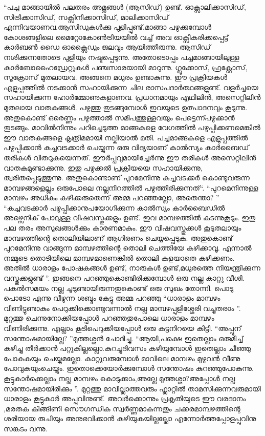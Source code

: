 ``പച്ച മാങ്ങായിൽ പലതരം അമ്ലങ്ങൾ (ആസിഡ്) ഉണ്ട്. ഓക്സാലിക്കാസിഡ്, സിട്രിക്കാസിഡ്, സക്സിനിക്കാസിഡ്, മാലിക്കാസിഡ് എന്നിവയാണവ.ആസിഡുകൾക്കു പുളിപ്പുണ്ട്.മാങ്ങാ പഴുക്കുമ്പോൾ കോശങ്ങളിലെ മൈറ്റോകോൺട്രിയയിൽ വച്ച് അവ ഓക്സീകരിക്കപ്പെട്ട് കാർബൺ ഡൈ ഓക്സൈഡും ജലവും ആയിത്തീരുന്നു. ആസിഡ് നശിക്കുന്നതോടെ പുളിയും നഷ്ടപ്പെടുന്നു. അതോടൊപ്പം പച്ചമാങ്ങായിലുള്ള കാർബോഹൈഡ്രേറ്റുകൾ പഞ്ചസാരയായി മാറുന്നു. ഗ്ലൂക്കോസ്, ഫ്രക്റ്റോസ്, സൂക്രോസ് മുതലായവ. അങ്ങനെ മധുരം ഉണ്ടാകുന്നു.
ഈ പ്രക്രിയകൾ എളുപ്പത്തിൽ നടക്കാൻ സഹായിക്കുന്ന ചില രാസപദാർത്ഥങ്ങളുണ്ട്. വളർച്ചയെ സഹായിക്കുന്ന ഹോർമ്മോണുകളാണവ. പ്രധാനമായും എഥിലിൻ, അസെറ്റിലിൻ മുതലായ വാതകങ്ങൾ. പഴുത്തു തുടങ്ങുമ്പോൾ ഇവയുടെ ഉത്പാദനവും കൂടുന്നു. അതുകൊണ്ട് ഒരെണ്ണം പഴുത്താൽ സമീപത്തുള്ളവയും പെട്ടെന്ന്പഴുക്കാൻ തുടങ്ങും. മാവിൽനിന്നും പറിച്ചെടുത്ത മാങ്ങകളെ വേഗത്തിൽ പഴുപ്പിക്കണമെങ്കിൽ ഈ വാതകങ്ങളെ കൃത്രിമമായി നല്കിയാൽ മതി. പച്ചമാങ്ങകളെ എളുപ്പത്തിൽ പഴുപ്പിക്കാൻ കച്ചവടക്കാർ ചെയ്യുന്ന ഒരു വിദ്യയാണ്‌ കാൽസ്യം കാർബൈഡ് തരികൾ വിതറുകയെന്നത്. ഈർപ്പവുമായിച്ചേർന്നു ഈ തരികൾ അസെറ്റിലിൻ വാതകമുണ്ടാക്കുന്നു. ഇതു പഴുക്കൽ പ്രക്രിയയെ സഹായിക്കുന്നു, ത്വരിതപ്പെടുത്തുന്നു. അതുകൊണ്ടാണ്‌ പുറമേനിന്നു കച്ചവടക്കർ കൊണ്ടുവരുന്ന മാമ്പഴങ്ങളെല്ലം ഒരുപോലെ നല്ലനിറത്തിൽ പഴുത്തിരിക്കുന്നത്``.
``പുറമെനിന്നുള്ള മാമ്പഴം അധികം കഴിക്കരുതെന്ന് അമ്മ പറഞ്ഞല്ലോ, അതെന്താ? ''
``കച്ചവടക്കാർ പഴുപ്പിക്കാനുപയോഗിക്കുന്ന കാൽസ്യം കാർബൈഡിൽ അഴ്സെനിക് പോലുള്ള വിഷവസ്തുക്കളും ഉണ്ട്. ഇവ മാമ്പഴത്തിൽ കടന്നുകൂടും. ഇതു പല തരം അസുഖങ്ങൾക്കും കാരണമാകും. ഈ വിഷവസ്തുക്കൾ കൂടുതലായും മാമ്പഴത്തിന്റെ തൊലിയിലാണ്‌ ആഗിരണം ചെയ്യപ്പെടുക. അതുകൊണ്ട് പുറമേനിന്നു വാങ്ങുന്ന മാമ്പഴത്തിന്റെ തൊലി ചെത്തിയേ കഴിക്കാവൂ. എന്നാൽ നമ്മുടെ തൊടിയിലെ മാമ്പഴമാണെങ്കിൽ തൊലി കളയാതെ കഴിക്കണം. അതിൽ ധാരാളം പോഷകങ്ങൾ ഉണ്ട്, നാരുകൾ ഉണ്ട്,മധുരത്തെ നിയന്ത്രിക്കുന്ന വസ്തുക്കളുണ്ട് ''.
ഇങ്ങനെ പറഞ്ഞുകൊണ്ടിരിക്കുമ്പോൾ ഒരു നല്ല കാറ്റു വീശി. പകൽസമയം നല്ല ചൂടുണ്ടായിരുന്നതുകൊണ്ട് ഒരു സുഖം തോന്നി. പൊടു പൊടോ എന്നു വീഴുന്ന ശബ്ദം കേട്ടു അമ്മ പറഞ്ഞു
``ധാരാളം മാമ്പഴം വീണിട്ടുണ്ടാകും പെറുക്കിക്കൊണ്ടുവന്നാൽ നല്ല മാമ്പഴപ്പുളിശ്ശേരി വച്ചുതരാം ''.
മുറ്റത്തു ചെന്നുനോക്കിയപ്പോൾ പറഞ്ഞതുപോലെ ധാരാളം മാമ്പഴം വീണിരിക്കുന്നു. എല്ലാം കൂടിപെറുക്കിയപ്പോൾ ഒരു കുട്ടനിറയെ കിട്ടി.
``അപ്പൂന്‌ സന്തോഷമായില്ലേ? ''മുത്തശ്ശൻ ചോദിച്ചു.
``ആയി,പക്ഷെ ഇതെല്ലാം ഒരുമിച്ച് കഴിച്ചു തീർക്കാൻ പറ്റുകില്ലല്ലൊ.കുറച്ചുദിവസം കഴിയുമ്പോൾ ഇതെല്ലാം ചീഞ്ഞു പോകുകയും ചെയ്യുമല്ലോ. കാറ്റുവരുമ്പോൾ മാവിലെ മാമ്പഴം മുഴുവൻ വീണു പോവുകയുംചെയ്യും. ഇതൊക്കെയോർക്കുമ്പോൾ സന്തോഷം കുറഞ്ഞുപോകുന്നു. കൂട്ടുകാർക്കെല്ലാം നല്ല മാമ്പഴം കൊടുക്കാം,അല്ലേ മുത്തശ്ശാ?അപ്പോൾ നല്ല സന്തോഷമായിരിക്കും ''.
  മുറ്റത്തു മാവില്ലാത്തവരും ഫ്ലാറ്റിൽ താമസിക്കുന്നവരുമായി ധാരാളം കൂട്ടുകാർ അപ്പുവിനുണ്ട്. അവർക്കൊന്നും പ്രകൃതിയുടെ ഈ വരദാനം ,മരതക കിങ്ങിണി സൌഗന്ധിക സ്വർണ്ണമാകുന്നതും ചക്കരമാമ്പഴത്തിന്റെ ശരിയായ രുചിയും അനുഭവിക്കാൻ കഴിയുകയില്ലല്ലോ എന്നോർത്തപ്പോളപ്പുവിനു സങ്കടം വന്നു.
